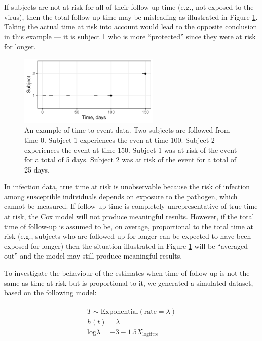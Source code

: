If subjects are not at risk for all of their follow-up time (e.g., not exposed to the virus), then the total follow-up time may be misleading as illustrated in Figure \ref{CoxExamplePartial}. Taking the actual time at risk into account would lead to the opposite conclusion in this example --- it is subject 1 who is more ``protected'' since they were at risk for longer.

\begin{figure}[htp]
	\centering
	\includegraphics[width=0.6\textwidth]{../curve-cox/timeplot_2_light.pdf}
	\caption{
	An example of time-to-event data. Two subjects are followed from time 0. Subject 1 experiences the even at time 100. Subject 2 experiences the event at time 150. Subject 1 was at risk of the event for a total of 5 days. Subject 2 was at risk of the event for a total of 25 days.
	}
	\label{CoxExamplePartial}
\end{figure}

In infection data, true time at risk is unobservable because the risk of infection among susceptible individuals depends on exposure to the pathogen, which cannot be measured. If follow-up time is completely unrepresentative of true time at risk, the Cox model will not produce meaningful results. However, if the total time of follow-up is assumed to be, on average, proportional to the total time at risk (e.g., subjects who are followed up for longer can be expected to have been exposed for longer) then the situation illustrated in Figure  \ref{CoxExamplePartial} will be ``averaged out'' and the model may still produce meaningful results.

To investigate the behaviour of the estimates when time of follow-up is not the same as time at risk but is proportional to it, we generated a simulated dataset, based on the following model:

\begin{align*}
\begin{gathered}
T \sim \text{Exponential}(\text{rate} = \lambda) \\
h(t) = \lambda \\
\text{log}\lambda = -3 - 1.5 X_{\text{logtitre}}
\end{gathered}
\end{align*}

